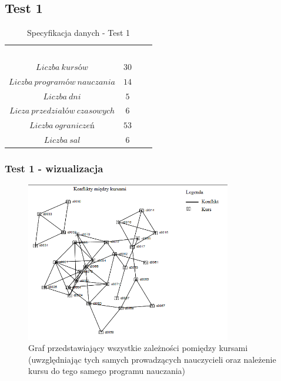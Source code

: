 \subsection{Test 1}
\begin{table}[H]
\begin{center}

\begin{tabular}{ |c|c|c|c| }
\multicolumn{1}{r}{}
 &  \multicolumn{1}{c}{$$}
 & \multicolumn{1}{c}{$$} 
 \\
\cline{1-2}
$Liczba\ kursów$ & $30$\\
\cline{1-2}
$Liczba\ programów\ nauczania$ & $14$\\
\cline{1-2}
$Liczba\ dni$ & $5$ \\
\cline{1-2}
$Licza\ przedziałów\ czasowych$ & $6$ \\
\cline{1-2}
$Liczba\ ograniczeń$ & $53$ \\
\cline{1-2}
$Liczba\ sal$ & $6$ \\
\cline{1-2}
\end{tabular}
\end{center}
\caption {Specyfikacja danych - Test 1}
\end{table}
\subsubsection{Test 1 - wizualizacja}


\begin{figure}[H]
  \caption{Graf przedstawiający wszystkie zależności pomiędzy kursami (uwzględniając tych samych prowadzących nauczycieli oraz należenie kursu do tego samego programu nauczania) }
  \centering
    \includegraphics[width=0.8\textwidth]{test1.PNG}
\end{figure}


